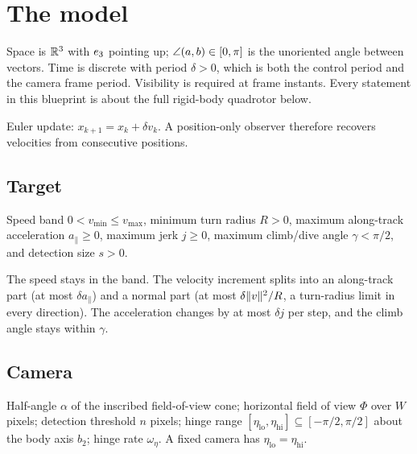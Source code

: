 \chapter{The model}
\label{chap:model}

Space is $\mathbb{R}^3$ with $e_3$ pointing up; $\angle(a,b)\in[0,\pi]$ is the unoriented
angle between vectors. Time is discrete with period $\delta>0$, which is both the
control period and the camera frame period. Visibility is required at frame
instants. Every statement in this blueprint is about the full rigid-body
quadrotor below.

\begin{definition}[Stepping]
\label{def:steps}
\leanok
Euler update: $x_{k+1}=x_k+\delta v_k$. A position-only observer therefore recovers
velocities from consecutive positions.
\end{definition}

\section{Target}

\begin{definition}
\label{def:target-params}
\leanok
Speed band $0<v_{\min}\le v_{\max}$, minimum turn radius $R>0$, maximum along-track
acceleration $a_\parallel\ge0$, maximum jerk $j\ge0$, maximum climb/dive angle
$\gamma<\pi/2$, and detection size $s>0$.
\end{definition}

\begin{definition}
\label{def:target-traj}
\leanok
{}
The speed stays in the band. The velocity increment splits into an along-track
part (at most $\delta a_\parallel$) and a normal part (at most
$\delta\lVert v \rVert^2/R$, a turn-radius limit in every direction). The acceleration
changes by at most $\delta j$ per step, and the climb angle stays within $\gamma$.
\end{definition}

\section{Camera}

\begin{definition}
\label{def:camera-params}
\leanok
Half-angle $\alpha$ of the inscribed field-of-view cone; horizontal field of view
$\Phi$ over $W$ pixels; detection threshold $n$ pixels; hinge range
$[\eta_{\mathrm{lo}},\eta_{\mathrm{hi}}]\subseteq[-\pi/2,\pi/2]$ about the body
axis $b_2$; hinge rate $\omega_\eta$. A fixed camera has
$\eta_{\mathrm{lo}}=\eta_{\mathrm{hi}}$.
\end{definition}

